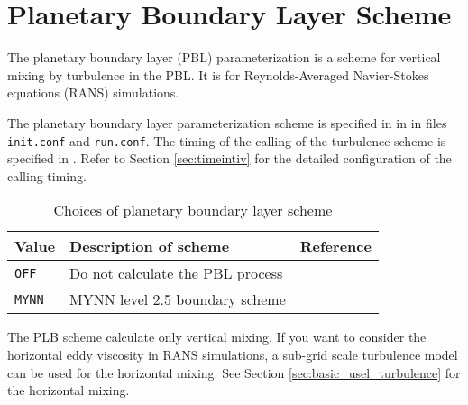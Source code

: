 
\section{Planetary Boundary Layer Scheme} \label{sec:basic_usel_pbl}

The planetary boundary layer (PBL) parameterization is a scheme for vertical mixing by turbulence in the PBL.
It is for Reynolds-Averaged Navier-Stokes equations (RANS) simulations.

The planetary boundary layer parameterization scheme is specified in  in  in files \verb|init.conf| and \verb|run.conf|. The timing of the calling of the turbulence scheme is specified in . Refer to Section \ref{sec:timeintiv} for the detailed configuration of the calling timing.

\begin{table}[h]
\begin{center}
  \caption{Choices of planetary boundary layer scheme}
  \label{tab:nml_atm_bl}
  \begin{tabularx}{150mm}{lXX} \hline
    \rowcolor[gray]{0.9}  Value & Description of scheme & Reference\\ \hline
      \verb|OFF|          & Do not calculate the PBL process &  \\
      \verb|MYNN|         & MYNN level 2.5 boundary scheme & \citet{my_1982,nakanishi_2004} \\
    \hline
  \end{tabularx}
\end{center}
\end{table}

The PLB scheme calculate only vertical mixing.
If you want to consider the horizontal eddy viscosity in RANS simulations,
a sub-grid scale turbulence model can be used for the horizontal mixing.
See Section \ref{sec:basic_usel_turbulence} for the horizontal mixing.
